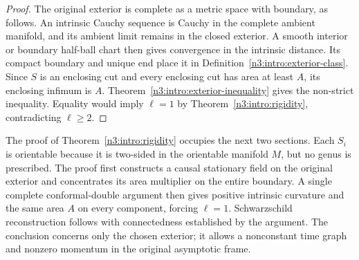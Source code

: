 \begin{proof}
The original exterior is complete as a metric space with boundary,
as follows. An intrinsic Cauchy sequence is Cauchy in the complete
ambient manifold, and its ambient limit remains in the closed exterior.
A smooth interior or boundary half-ball chart then gives convergence
in the intrinsic distance. Its compact
boundary and unique end place it in
Definition~\ref{n3:intro:exterior-class}. Since $S$ is an enclosing cut
and every enclosing cut has area at least $A$, its enclosing infimum
is $A$. Theorem~\ref{n3:intro:exterior-inequality} gives the non-strict
inequality. Equality would imply $\ell=1$ by
Theorem~\ref{n3:intro:rigidity}, contradicting $\ell\geq2$.
\end{proof}

The proof of Theorem~\ref{n3:intro:rigidity} occupies the next two
sections. Each $S_i$ is orientable because it is two-sided in the
orientable manifold $M$, but no genus is prescribed. The proof first
constructs a causal stationary field on the original exterior and
concentrates its area multiplier on the entire boundary. A single
complete conformal-double argument then gives positive intrinsic
curvature and the same area $A$ on every component, forcing
$\ell=1$. Schwarzschild reconstruction follows with connectedness
established by the argument. The conclusion concerns only the chosen
exterior; it allows a nonconstant time graph and nonzero momentum in
the original asymptotic frame.

